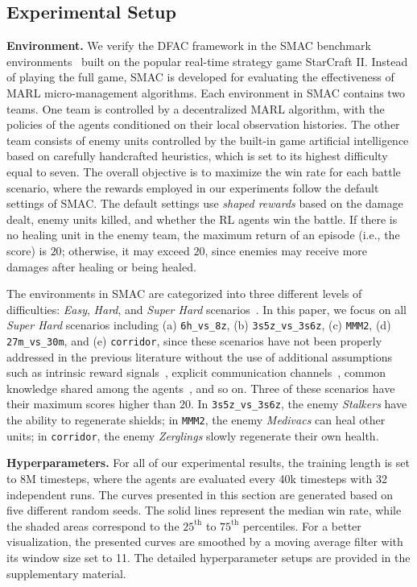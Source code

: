 \documentclass{article}
\begin{document}
\subsection{Experimental Setup}
\label{subsec:experiment_results_setup_of_smac}

\textbf{Environment.}
We verify the DFAC framework in the SMAC benchmark environments~\cite{Samvelyan2019SMAC} built on the popular real-time strategy game StarCraft II. Instead of playing the full game, SMAC is developed for evaluating the effectiveness of MARL micro-management algorithms. Each environment in SMAC contains two teams. One team is controlled by a decentralized MARL algorithm, with the policies of the agents conditioned on their local observation histories. The other team consists of enemy units controlled by the built-in game artificial intelligence based on carefully handcrafted heuristics, which is set to its highest difficulty equal to seven. The overall objective is to maximize the win rate for each battle scenario, where the rewards employed in our experiments follow the default settings of SMAC. The default settings use \textit{shaped rewards} based on the damage dealt, enemy units killed, and whether the RL agents win the battle. If there is no healing unit in the enemy team, the maximum return of an episode (i.e., the score) is $20$; otherwise, it may exceed $20$, since enemies may receive more damages after healing or being healed.

The environments in SMAC are categorized into three different levels of difficulties: \textit{Easy}, \textit{Hard}, and \textit{Super Hard} scenarios~\cite{Samvelyan2019SMAC}. In this paper, we focus on all \textit{Super Hard} scenarios including (a) \texttt{6h\_vs\_8z},  (b) \texttt{3s5z\_vs\_3s6z}, (c) \texttt{MMM2}, (d) \texttt{27m\_vs\_30m}, and (e) \texttt{corridor}, since these scenarios have not been properly addressed in the previous literature without the use of additional assumptions such as intrinsic reward signals~\cite{Du2019LIIR}, explicit communication channels~\cite{Zhang2019VBN,Wang2019NDQ}, common knowledge shared among the agents~\cite{De2019MACKRL,Wang2020ROMA}, and so on. Three of these scenarios have their maximum scores higher than $20$. In \texttt{3s5z\_vs\_3s6z}, the enemy \textit{Stalkers} have the ability to regenerate shields; in \texttt{MMM2}, the enemy \textit{Medivacs} can heal other units; in \texttt{corridor}, the enemy \textit{Zerglings} slowly regenerate their own health.

\textbf{Hyperparameters.}
For all of our experimental results, the training length is set to 8M timesteps, where the agents are evaluated every 40k timesteps with 32 independent runs. The curves presented in this section are generated based on five different random seeds. The solid lines represent the median win rate, while the shaded areas correspond to the $25^{\text{th}}$ to $75^{\text{th}}$ percentiles. For a better visualization, the presented curves are smoothed by a moving average filter with its window size set to 11. The detailed hyperparameter setups are provided in the supplementary material.
\end{document}
